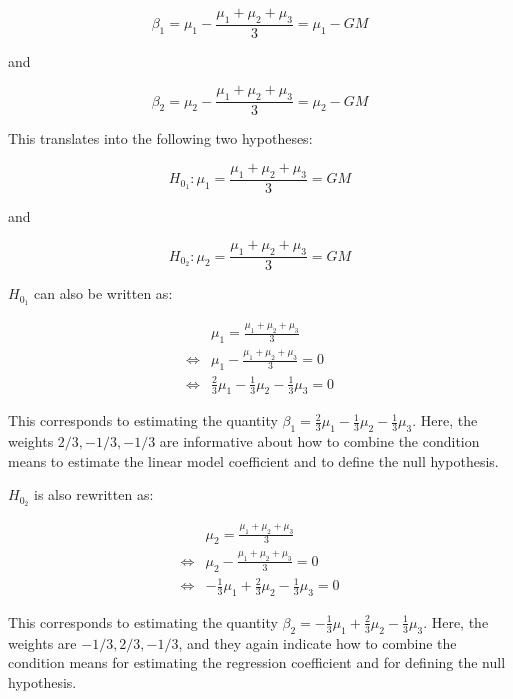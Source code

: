 \documentclass[12pt,]{krantz}
\theoremstyle{definition}
\theoremstyle{definition}
\theoremstyle{definition}
\theoremstyle{remark}
\begin{document}
\begin{equation}
\beta_1 = \mu_1 - \frac{\mu_1+\mu_2+\mu_3}{3} = \mu_1 - GM
\end{equation}

\noindent
and

\begin{equation}
\beta_2 = \mu_2 - \frac{\mu_1+\mu_2+\mu_3}{3} = \mu_2 - GM
\end{equation}

This translates into the following two hypotheses:

\begin{equation}
H_{0_1}: \mu_1 = \frac{\mu_1+\mu_2+\mu_3}{3} = GM
\end{equation}

\noindent
and

\begin{equation}
H_{0_2}: \mu_2 = \frac{\mu_1+\mu_2+\mu_3}{3} = GM
\end{equation}

\(H_{0_1}\) can also be written as:

\begin{align} \label{h01}
& \mu_1 =\frac{\mu_1+\mu_2+\mu_3}{3}\\
\Leftrightarrow & \mu_1 - \frac{\mu_1+\mu_2+\mu_3}{3} = 0\\
\Leftrightarrow & \frac{2}{3} \mu_1 - \frac{1}{3}\mu_2 - \frac{1}{3}\mu_3 = 0
\end{align}

\noindent
This corresponds to estimating the quantity
\(\beta_1 = \frac{2}{3} \mu_1 - \frac{1}{3}\mu_2 - \frac{1}{3}\mu_3\).
Here, the weights \(2/3, -1/3, -1/3\) are informative about how to
combine the condition means to estimate the linear model coefficient and
to define the null hypothesis.

\(H_{0_2}\) is also rewritten as:

\begin{align}\label{h02}
&  \mu_2 = \frac{\mu_1+\mu_2+\mu_3}{3}\\
\Leftrightarrow & \mu_2 - \frac{\mu_1+\mu_2+\mu_3}{3} = 0 \\
\Leftrightarrow & -\frac{1}{3}\mu_1 + \frac{2}{3} \mu_2 - \frac{1}{3} \mu_3 = 0
\end{align}

\noindent
This corresponds to estimating the quantity
\(\beta_2 = -\frac{1}{3}\mu_1 + \frac{2}{3} \mu_2 - \frac{1}{3} \mu_3\).
Here, the weights are \(-1/3, 2/3, -1/3\), and they again indicate how
to combine the condition means for estimating the regression coefficient
and for defining the null hypothesis.
\end{document}
